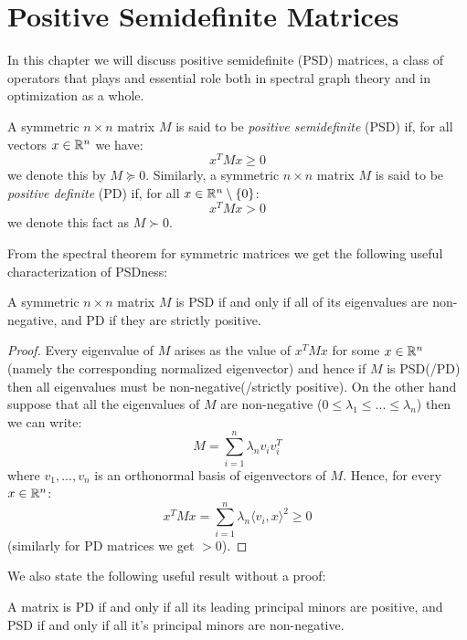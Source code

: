 \chapter{Positive Semidefinite Matrices}
In this chapter we will discuss positive semidefinite (PSD) matrices, a class of operators that plays and essential role both in spectral graph theory and in optimization as a whole.

\begin{definition}
A symmetric $n \times n$ matrix $M$ is said to be \emph{positive semidefinite} (PSD) if, for all vectors $x \in \mathbb{R}^n$ we have:
\[
    x^TMx \geq 0
\]
we denote this by $M \succeq 0$. Similarly, a symmetric $n \times n$ matrix $M$ is said to be \emph{positive definite} (PD) if, for all $x \in \mathbb{R}^{n}\setminus\{0\}$:
\[
    x^TMx > 0
\]
we denote this fact as $M \succ 0$.
\end{definition}

From the spectral theorem for symmetric matrices we get the following useful characterization of PSDness:

\begin{theorem}
A symmetric $n \times n$ matrix $M$ is PSD if and only if all of its eigenvalues are non-negative, and PD if they are strictly positive.
\end{theorem}
\begin{proof}
Every eigenvalue of $M$ arises as the value of $x^TMx$ for some $x \in \mathbb{R}^n$ (namely the corresponding normalized eigenvector) and hence if $M$ is PSD(/PD) then all eigenvalues must be non-negative(/strictly positive). On the other hand suppose that all the eigenvalues of $M$ are non-negative ($0 \leq \lambda_1 \leq ... \leq \lambda_n$) then we can write:
\[
    M = \sum_{i=1}^n \lambda_n v_iv_i^T
\]
where $v_1, ... , v_n$ is an orthonormal basis of eigenvectors of $M$. Hence, for every $x \in \mathbb{R}^n$:
\[
    x^TMx = \sum_{i=1}^n \lambda_n \langle v_i , x\rangle^2 \geq 0
\]
(similarly for PD matrices we get $>0$).
\end{proof}

We also state the following useful result without a proof:
\begin{theorem}
A matrix is PD if and only if all its leading principal minors are positive, and PSD if and only if all it's principal minors are non-negative.
\end{theorem}

